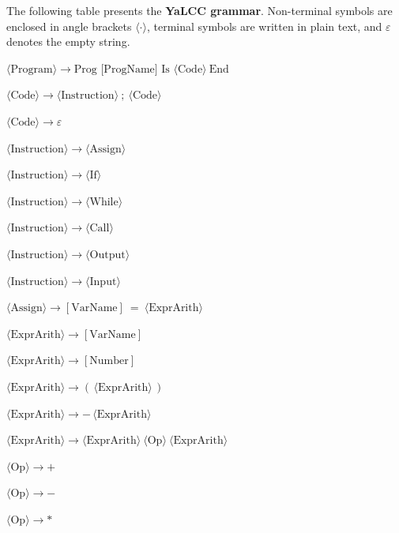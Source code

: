 \documentclass{article}
\begin{document}
\noindent
The following table presents the \textbf{YaLCC grammar}. Non-terminal symbols are enclosed in angle brackets $\langle\cdot\rangle$, terminal symbols are written in plain text, and $\varepsilon$ denotes the empty string. \\

\begin{enumerate}[label={[\,\arabic*\,]},leftmargin=*,itemsep=4pt]
  \item \(\langle\text{Program}\rangle \rightarrow \text{Prog [ProgName] Is }\langle\text{Code}\rangle\ \text{End}\)
  \item \(\langle\text{Code}\rangle \rightarrow \langle\text{Instruction}\rangle\ ;\ \langle\text{Code}\rangle\)
  \item \(\langle\text{Code}\rangle \rightarrow \varepsilon\)
  \item \(\langle\text{Instruction}\rangle \rightarrow \langle\text{Assign}\rangle\)
  \item \(\langle\text{Instruction}\rangle \rightarrow \langle\text{If}\rangle\)
  \item \(\langle\text{Instruction}\rangle \rightarrow \langle\text{While}\rangle\)
  \item \(\langle\text{Instruction}\rangle \rightarrow \langle\text{Call}\rangle\)
  \item \(\langle\text{Instruction}\rangle \rightarrow \langle\text{Output}\rangle\)
  \item \(\langle\text{Instruction}\rangle \rightarrow \langle\text{Input}\rangle\)
  \item \(\langle\text{Assign}\rangle \rightarrow [\text{VarName}]\ =\ \langle\text{ExprArith}\rangle\)
  \item \(\langle\text{ExprArith}\rangle \rightarrow [\text{VarName}]\)
  \item \(\langle\text{ExprArith}\rangle \rightarrow [\text{Number}]\)
  \item \(\langle\text{ExprArith}\rangle \rightarrow (\,\langle\text{ExprArith}\rangle\,)\)
  \item \(\langle\text{ExprArith}\rangle \rightarrow -\,\langle\text{ExprArith}\rangle\)
  \item \(\langle\text{ExprArith}\rangle \rightarrow \langle\text{ExprArith}\rangle\ \langle\text{Op}\rangle\ \langle\text{ExprArith}\rangle\)
  \item \(\langle\text{Op}\rangle \rightarrow +\)
  \item \(\langle\text{Op}\rangle \rightarrow -\)
  \item \(\langle\text{Op}\rangle \rightarrow *\)

\end{enumerate}
\end{document}

